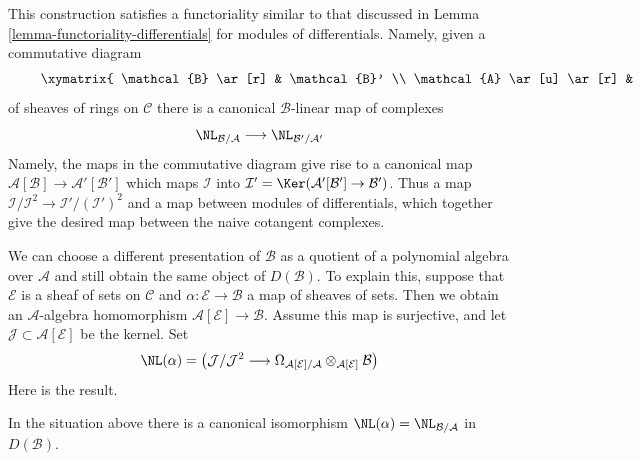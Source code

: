 \noindent
This construction satisfies a functoriality similar to that discussed
in Lemma \ref{lemma-functoriality-differentials} for modules of differentials.
Namely, given a commutative diagram
\begin{equation}
\label{equation-commutative-square-sheaves}
\vcenter{
\xymatrix{
\mathcal{B} \ar[r] & \mathcal{B}' \\
\mathcal{A} \ar[u] \ar[r] & \mathcal{A}' \ar[u]
}
}
\end{equation}
of sheaves of rings on $\mathcal{C}$ there is a canonical
$\mathcal{B}$-linear map of complexes
$$
\NL_{\mathcal{B}/\mathcal{A}} \longrightarrow \NL_{\mathcal{B}'/\mathcal{A}'}
$$
Namely, the maps in the commutative diagram give rise to a canonical map
$\mathcal{A}[\mathcal{B}] \to \mathcal{A}'[\mathcal{B}']$
which maps $\mathcal{I}$ into
$\mathcal{I}' = \Ker(\mathcal{A}'[\mathcal{B}'] \to \mathcal{B}')$.
Thus a map $\mathcal{I}/\mathcal{I}^2 \to \mathcal{I}'/(\mathcal{I}')^2$
and a map between modules of differentials, which together give the
desired map between the naive cotangent complexes.

\medskip\noindent
We can choose a different presentation of $\mathcal{B}$ as a quotient of a
polynomial algebra over $\mathcal{A}$ and still obtain the same object
of $D(\mathcal{B})$. To explain this, suppose that $\mathcal{E}$ is
a sheaf of sets on $\mathcal{C}$ and $\alpha : \mathcal{E} \to \mathcal{B}$
a map of sheaves of sets. Then we obtain an $\mathcal{A}$-algebra
homomorphism $\mathcal{A}[\mathcal{E}] \to \mathcal{B}$. Assume this map
is surjective, and let $\mathcal{J} \subset \mathcal{A}[\mathcal{E}]$
be the kernel. Set
$$
\NL(\alpha) = \left(
\mathcal{J}/\mathcal{J}^2
\longrightarrow
\Omega_{\mathcal{A}[\mathcal{E}]/\mathcal{A}}
\otimes_{\mathcal{A}[\mathcal{E}]} \mathcal{B}\right)
$$
Here is the result.

\begin{lemma}
\label{lemma-NL-up-to-qis}
In the situation above there is a canonical isomorphism
$\NL(\alpha) = \NL_{\mathcal{B}/\mathcal{A}}$ in $D(\mathcal{B})$.
\end{lemma}

